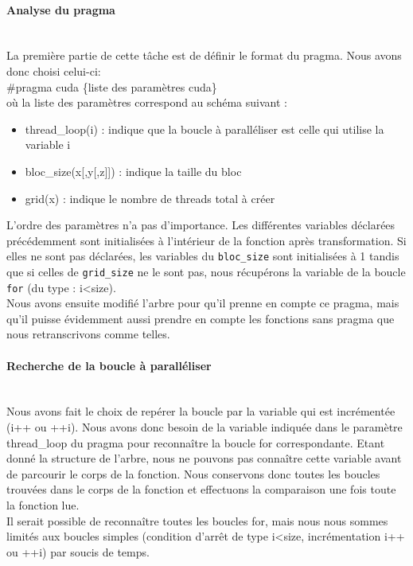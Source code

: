\documentclass{article}
\begin{document}
	\paragraph{Analyse du pragma}
	~~\\
	\indent
	La première partie de cette tâche est de définir le format du pragma. Nous avons donc choisi celui-ci:
	\\\#pragma cuda \{liste des paramètres cuda\}
	\\où la liste des paramètres correspond au schéma suivant :
	\begin{itemize}
		\item thread\_loop(i) : indique que la boucle à paralléliser est celle qui utilise la variable i
		\item bloc\_size(x[,y[,z]]) : indique la taille du bloc
		\item grid(x) : indique le nombre de threads total à créer
	\end{itemize}
	L'ordre des paramètres n'a pas d'importance.
	Les différentes variables déclarées précédemment sont initialisées à l'intérieur de la fonction après transformation.
	Si elles ne sont pas déclarées, les variables du \verb|bloc_size| sont initialisées à 1 tandis que si celles de \verb|grid_size| ne le sont pas, nous récupérons la variable de la boucle \verb|for| (du type : i\textless size).
	\\Nous avons ensuite modifié l'arbre pour qu'il prenne en compte ce pragma, mais qu'il puisse évidemment aussi prendre en compte les fonctions sans pragma que nous retranscrivons comme telles.
	
	
	\paragraph{Recherche de la boucle à paralléliser}
	~~\\
	\indent
	Nous avons fait le choix de repérer la boucle par la variable qui est incrémentée (i++ ou ++i). Nous avons donc besoin de la variable indiquée dans le paramètre thread\_loop du pragma pour reconnaître la boucle for correspondante. Etant donné la structure de l'arbre, nous ne pouvons pas connaître cette variable avant de parcourir le corps de la fonction. Nous conservons donc toutes les boucles trouvées dans le corps de la fonction et effectuons la comparaison une fois toute la fonction lue.
	\\Il serait possible de reconnaître toutes les boucles for, mais nous nous sommes limités aux boucles simples (condition d'arrêt de type i\textless size, incrémentation i++ ou ++i) par soucis de temps.
	
\end{document}
